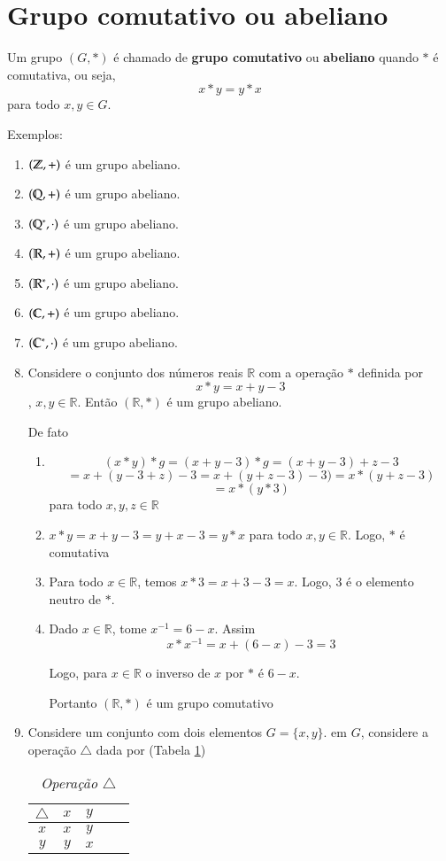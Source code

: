 \section{Grupo comutativo ou abeliano}
\begin{definicao} Um grupo $(G,*)$ {\'e} chamado de \textbf{grupo comutativo} ou \textbf{abeliano} quando $*$ {\'e} comutativa, ou seja, \[x*y=y*x\] para todo $x,y\in G$.
\end{definicao}
\vspace{1cm}

Exemplos:
\begin{enumerate}
\item $(\mathbb{Z},+)$ {\'e} um grupo abeliano.
\item $(\mathbb{Q},+)$ {\'e} um grupo abeliano.
\item $(\mathbb{Q}^*,\cdot)$ {\'e} um grupo abeliano.
\item $(\mathbb{R},+)$ {\'e} um grupo abeliano.
\item $(\mathbb{R}^*,\cdot)$ {\'e} um grupo abeliano.
\item $(\mathbb{C},+)$ {\'e} um grupo abeliano.
\item $(\mathbb{C}^*,\cdot)$ {\'e} um grupo abeliano.
\item Considere o conjunto dos n{\'u}meros reais $\mathbb{R}$ com a opera{\c c}{\~a}o $*$ definida por \[x*y=x+y-3\], $x,y\in\mathbb{R}$. Ent{\~a}o $(\mathbb{R},*)$ {\'e} um grupo abeliano.

De fato
\begin{enumerate}
\item \[(x*y)*g=(x+y-3)*g=(x+y-3)+z-3\]
\[=x+(y-3+z)-3=x+(y+z-3)-3)=x*(y+z-3)\]
\[=x*(y*3)\] para todo $x,y,z\in \mathbb{R}$
\item $x*y=x+y-3=y+x-3=y*x$ para todo $x,y\in\mathbb{R}$. Logo, $*$ {\'e} comutativa
\item Para todo $x\in\mathbb{R}$, temos $x*3=x+3-3=x$. Logo, 3 {\'e} o elemento neutro de $*$.
\item Dado $x\in\mathbb{R}$, tome $x^{-1}=6-x$. Assim \[x*x^{-1}=x+(6-x)-3=3\]

Logo, para $x\in\mathbb{R}$ o inverso de $x$ por $*$ {\'e} $6-x$.

Portanto $(\mathbb{R}, *)$ {\'e} um grupo comutativo
\end{enumerate}
\item Considere um conjunto com dois elementos $G=\{x,y\}$. em $G$, considere a opera{\c c}{\~a}o $\triangle$ dada por (Tabela \ref{6})
\begin{table}[h]
   \centering 
   \setlength{\arrayrulewidth}{0,5\arrayrulewidth}
   \caption{\it Opera{\c c}{\~a}o $\triangle$}
   \begin{tabular}{|c|c|c|c|c|} 
      \hline
      $\triangle$ & $x$ & $y$ \\
     \hline
      $x$ & $x$ & $y$ \\
      \hline
      $y$ & $y$ & $x$ \\
      \hline
   \end{tabular}
\label{6}
\end{table}


\end{enumerate}
